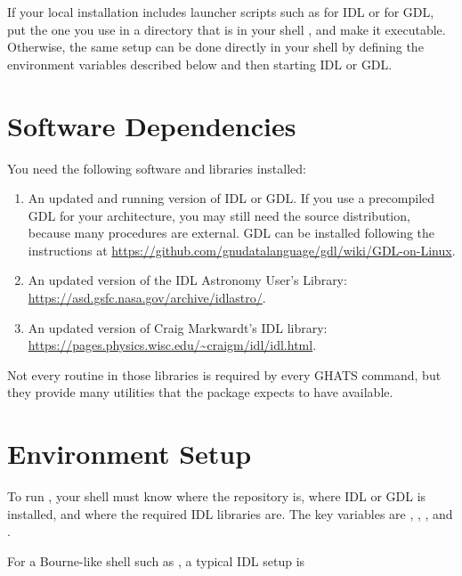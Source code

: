 If your local installation includes launcher scripts such as  for
IDL or  for GDL, put the one you use in a directory that is in your
shell , and make it executable.  Otherwise, the same setup can be
done directly in your shell by defining the environment variables described
below and then starting IDL or GDL.

\section{Software Dependencies}

You need the following software and libraries installed:

\begin{enumerate}
  \item An updated and running version of IDL or GDL.  If you use a precompiled
        GDL for your architecture, you may still need the source distribution,
        because many procedures are external.  GDL can be installed following
        the instructions at
        \url{https://github.com/gnudatalanguage/gdl/wiki/GDL-on-Linux}.
  \item An updated version of the IDL Astronomy User's Library:
        \url{https://asd.gsfc.nasa.gov/archive/idlastro/}.
  \item An updated version of Craig Markwardt's IDL library:
        \url{https://pages.physics.wisc.edu/~craigm/idl/idl.html}.
\end{enumerate}

Not every routine in those libraries is required by every GHATS command, but
they provide many utilities that the package expects to have available.

\section{Environment Setup}

To run \ghats{}, your shell must know where the repository is, where IDL or GDL
is installed, and where the required IDL libraries are.  The key variables are
, , , and .

For a Bourne-like shell such as , a typical IDL setup is


